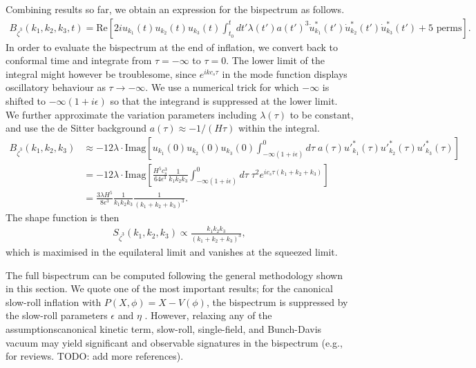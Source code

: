 Combining results so far, we obtain an expression for the bispectrum as follows.
\begin{align}
	B_{\dot{\zeta}^3}(k_1,k_2,k_3,t) = \text{Re}\left[ 2i u_{k_1}(t) u_{k_2}(t) u_{k_3}(t) \int_{t_0}^{t} dt' \lambda(t') a(t')^3 \dot{u}^*_{k_1}(t') \dot{u}^*_{k_2}(t') \dot{u}^*_{k_3}(t')   + \text{5 perms} \right].
\end{align}
In order to evaluate the bispectrum at the end of inflation, we convert back to conformal time and integrate from $\tau=-\infty$ to $\tau=0$. The lower limit of the integral might however be troublesome, since $e^{i k c_s \tau}$ in the mode function displays oscillatory behaviour as $\tau\rightarrow -\infty$. We use a numerical trick for which $-\infty$ is shifted to $-\infty(1+i\epsilon)$ so that the integrand is suppressed at the lower limit. We further approximate the variation parameters including $\lambda(\tau)$ to be constant, and use the de Sitter background $a(\tau)\approx -1/(H\tau)$ within the integral. 
\begin{align}
	B_{\dot{\zeta}^3}(k_1,k_2,k_3) &\approx -12\lambda \cdot \text{Imag}\left[  u_{k_1}(0) u_{k_2}(0) u_{k_3}(0) \int_{-\infty(1+i\epsilon)}^{0} d\tau \;  a(\tau) {u'}^*_{k_1}(\tau) {u'}^*_{k_2}(\tau) {u'}^*_{k_3}(\tau)  \right] \\
	&= -12\lambda \cdot \text{Imag} \left[ \frac{H^5 c_s^3}{64\epsilon^3} \frac{1}{k_1 k_2 k_3} \int_{-\infty(1+i\epsilon)}^{0} d\tau \; \tau^2 e^{ic_s\tau(k_1+k_2+k_3)} \right] \\
	&= \frac{3\lambda H^5}{8\epsilon^3} \frac{1}{k_1 k_2 k_3} \frac{1}{(k_1+k_2+k_3)^3}.
\end{align}
The shape function is then
\begin{align}
	S_{\dot{\zeta}^3}(k_1,k_2,k_3) \propto \frac{k_1 k_2 k_3}{(k_1+k_2+k_3)^3},
\end{align}
which is maximised in the equilateral limit and vanishes at the squeezed limit.

The full bispectrum can be computed following the general methodology shown in this section. We quote one of the most important results; for the canonical slow-roll inflation with $P(X,\phi) = X - V(\phi)$, the bispectrum is suppressed by the slow-roll parameters $\epsilon$ and $\eta$ \cite{Maldacena2013}. However, relaxing any of the assumptions\textemdash canonical kinetic term, slow-roll, single-field, and Bunch-Davis vacuum \textemdash may yield significant and observable signatures in the bispectrum (e.g., \cite{Chen2010,Komatsu2010} for reviews. TODO: add more references).

